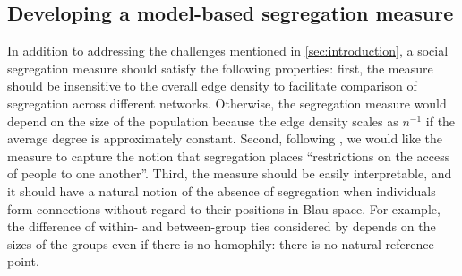 \documentclass{scrartcl}
\newcommand{\card}[1]{\left|#1\right|}
\newcommand{\population}{N}
\newcommand{\seeds}{U}
\newcommand{\nominees}{V}
\begin{document}


\subsection{Developing a model-based segregation measure\label{sec:model-based-segregation}}

In addition to addressing the challenges mentioned in \cref{sec:introduction}, a social segregation measure should satisfy the following properties: first, the measure should be insensitive to the overall edge density to facilitate comparison of segregation across different networks. Otherwise, the segregation measure would depend on the size of the population because the edge density scales as $n^{-1}$ if the average degree is approximately constant. Second, following \textcite{Freeman1978}, we would like the measure to capture the notion that segregation places ``restrictions on the access of people to one another''. Third, the measure should be easily interpretable, and it should have a natural notion of the absence of segregation when individuals form connections without regard to their positions in Blau space. For example, the difference of within- and between-group ties considered by \textcite{Krackhardt1988} depends on the sizes of the groups even if there is no homophily: there is no natural reference point.
\end{document}
